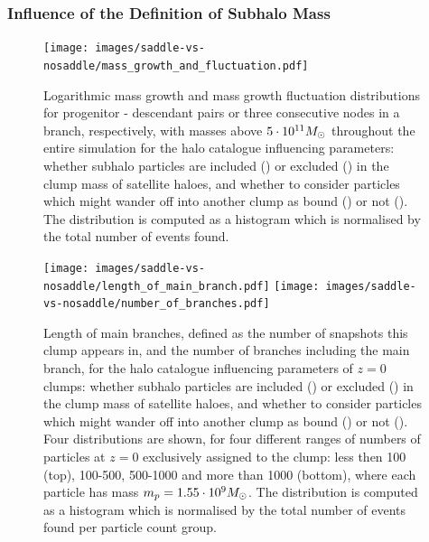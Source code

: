 \subsubsection{Influence of the Definition of Subhalo Mass}


\begin{figure}[H]
	\centering
	\texttt{[image: images/saddle-vs-nosaddle/mass\_growth\_and\_fluctuation.pdf]}%
	\caption{
		Logarithmic mass growth and mass growth fluctuation distributions for progenitor - descendant pairs or three consecutive nodes in a branch, respectively, with masses above $5\cdot 10^{11}M_\odot$ throughout the entire simulation for the halo catalogue influencing parameters: 
		whether subhalo particles are included (\inc) or excluded (\exc) in the clump mass of satellite haloes, and whether to consider particles which might wander off into another clump as bound (\nosad) or not (\sad).
		The distribution is computed as a histogram which is normalised by the total number of events found.
	}%
	\label{fig:saddle_nosaddle_masses}
\end{figure}

\begin{figure}[p]
	\centering
	\centering
	\texttt{[image: images/saddle-vs-nosaddle/length\_of\_main\_branch.pdf]}
	\endminipage%
	\hspace*{\fill}
	\centering
	\texttt{[image: images/saddle-vs-nosaddle/number\_of\_branches.pdf]}%
	\endminipage\hspace*{\fill} 
	\caption{
		Length of main branches, defined as the number of snapshots this clump appears in, and the number of branches including the main branch, for the halo catalogue influencing parameters of $z=0$ clumps: 
		whether subhalo particles are included (\inc) or excluded (\exc) in the clump mass of satellite haloes, and whether to consider particles which might wander off into another clump as bound (\nosad) or not (\sad).
		Four distributions are shown, for four different ranges of numbers of particles at $z=0$ exclusively assigned to the clump: less then 100 (top), 100-500, 500-1000 and more than 1000 (bottom), where each particle has mass $m_p = 1.55 \cdot 10^9 M_\odot$.
		The distribution is computed as a histogram which is normalised by the total number of events found per particle count group.
	}%
	\label{fig:saddle_nosaddle_mbl_nbranch}
\end{figure}

